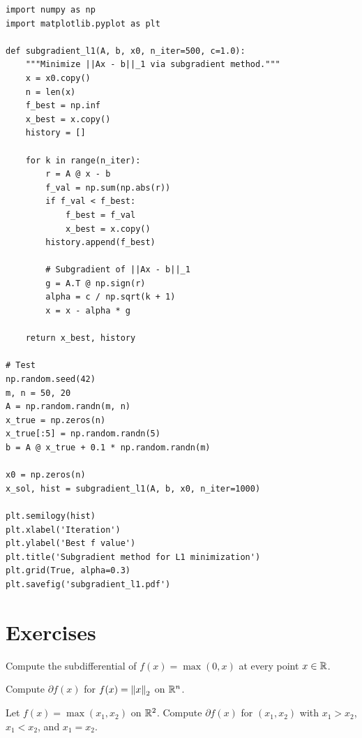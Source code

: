 \begin{codeblock}[title=\textbf{Subgradient method for $\ell_1$ minimization}]
\begin{verbatim}
import numpy as np
import matplotlib.pyplot as plt

def subgradient_l1(A, b, x0, n_iter=500, c=1.0):
    """Minimize ||Ax - b||_1 via subgradient method."""
    x = x0.copy()
    n = len(x)
    f_best = np.inf
    x_best = x.copy()
    history = []

    for k in range(n_iter):
        r = A @ x - b
        f_val = np.sum(np.abs(r))
        if f_val < f_best:
            f_best = f_val
            x_best = x.copy()
        history.append(f_best)

        # Subgradient of ||Ax - b||_1
        g = A.T @ np.sign(r)
        alpha = c / np.sqrt(k + 1)
        x = x - alpha * g

    return x_best, history

# Test
np.random.seed(42)
m, n = 50, 20
A = np.random.randn(m, n)
x_true = np.zeros(n)
x_true[:5] = np.random.randn(5)
b = A @ x_true + 0.1 * np.random.randn(m)

x0 = np.zeros(n)
x_sol, hist = subgradient_l1(A, b, x0, n_iter=1000)

plt.semilogy(hist)
plt.xlabel('Iteration')
plt.ylabel('Best f value')
plt.title('Subgradient method for L1 minimization')
plt.grid(True, alpha=0.3)
plt.savefig('subgradient_l1.pdf')
\end{verbatim}
\end{codeblock}

\section{Exercises}

\begin{exercise}[$\star$]
Compute the subdifferential of $f(x) = \max(0, x)$ at every point $x \in \mathbb{R}$.
\end{exercise}

\begin{exercise}[$\star$]
Compute $\partial f(x)$ for $f(x) = \left\| x \right\|_2$ on $\mathbb{R}^n$.
\end{exercise}

\begin{exercise}[$\star\star$]
Let $f(x) = \max(x_1, x_2)$ on $\mathbb{R}^2$. Compute $\partial f(x)$ for $(x_1, x_2)$
with $x_1 > x_2$, $x_1 < x_2$, and $x_1 = x_2$.
\end{exercise}


